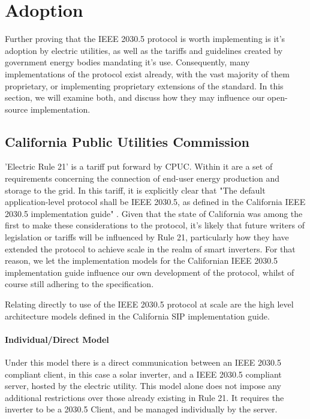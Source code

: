 \chapter{Adoption}\label{ch:adoption}

Further proving that the IEEE 2030.5 protocol is worth implementing is it's adoption by electric utilities, as well as the tariffs and guidelines created by government energy bodies mandating it's use.
Consequently, many implementations of the protocol exist already, with the vast majority of them proprietary, or implementing proprietary extensions of the standard.
In this section, we will examine both, and discuss how they may influence our open-source implementation. 

\section{California Public Utilities Commission}
'Electric Rule 21' is a tariff put forward by CPUC. Within it are a set of requirements concerning the connection of end-user energy production and storage to the grid. In this tariff, it is explicitly clear that
"The default application-level protocol shall be IEEE 2030.5, as defined in the California IEEE 2030.5 implementation guide" \cite[]{Rule21}.
Given that the state of California was among the first to make these considerations to the protocol, it's likely that future writers of legislation or tariffs will be influenced by Rule 21, particularly how they have extended the protocol to achieve scale in the realm of smart inverters.
For that reason, we let the implementation models for the Californian IEEE 2030.5 implementation guide influence our own development of the protocol, whilst of course still adhering to the specification.

Relating directly to use of the IEEE 2030.5 protocol at scale are the high level architecture models defined in the California SIP implementation guide.

\subsubsection{Individual/Direct Model}
Under this model there is a direct communication between an IEEE 2030.5 compliant client, in this case a solar inverter, and a IEEE 2030.5 compliant server, hosted by the electric utility.
This model alone does not impose any additional restrictions over those already existing in Rule 21. It requires the inverter to be a 2030.5 Client, and be managed individually by the server.

